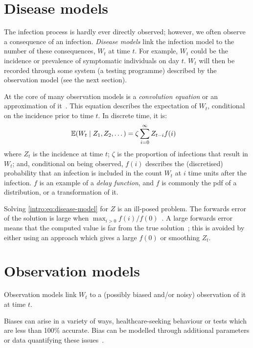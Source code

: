 \documentclass[thesis.tex]{subfiles}
\begin{document}
\section{Disease models} \label{intro:sec:disease-model}

The infection process is hardly ever directly observed; however, we often observe a consequence of an infection.
\emph{Disease models} link the infection model to the number of these consequences, $W_t$ at time $t$.
For example, $W_t$ could be the incidence or prevalence of symptomatic individuals on day $t$.
$W_t$ will then be recorded through some system (\eg a testing programme) described by the observation model (see the next section).

At the core of many observation models is a \emph{convolution equation} or an approximation of it~\autocite[e.g.][]{brookmeyerBackcalculation,abbottEstimating,birrellBayesian}.
This equation describes the expectation of $W_t$, conditional on the incidence prior to time $t$.
In discrete time, it is:
\begin{align}
    \operatorname{\mathbb{E}}(W_t \mid Z_1, Z_2, \dots) &= \zeta \sum_{i=0}^\infty Z_{t-i} f(i)
    \label{intro:eq:disease-model}
\end{align}
where $Z_t$ is the incidence at time $t$; $\zeta$ is the proportion of infections that result in $W_t$; and, conditional on being observed, $f(i)$ describes the (discretised) probability that an infection is included in the count $W_t$ at $i$ time units after the infection.
$f$ is an example of a \emph{delay function}, and $f$ is commonly the pdf of a distribution, or a transformation of it.

Solving \cref{intro:eq:disease-model} for $Z$ is an ill-posed problem.
The forwards error of the solution is large when $\max_{i > 0} f(i) / f(0)$~\autocite[chapter 8.2]{highamAccuracy}.
A large forwards error means that the computed value is far from the true solution~\autocite[6--9]{highamAccuracy}; this is avoided by either using an approach which gives a large $f(0)$ or smoothing $Z_t$.

\section{Observation models}

Observation models link $W_t$ to a (possibly biased and/or noisy) observation of it at time $t$.

Biases can arise in a variety of ways, \eg healthcare-seeking behaviour or tests which are less than 100\% accurate.
Bias can be modelled through additional parameters or data quantifying these issues~\autocite[e.g.][]{sherrattExploring,birrellBayesian,nicholsonImproving,swallow2022challenges}.
\end{document}
